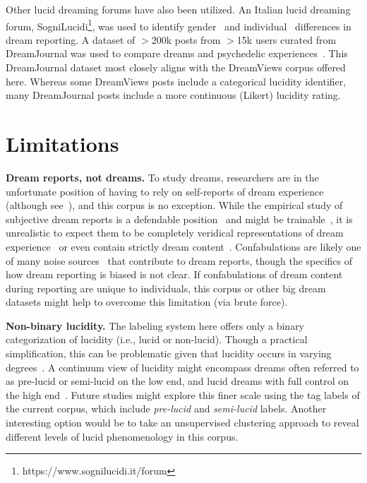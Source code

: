 \documentclass[10pt,a4paper,twocolumn]{article}
\begin{document}
\par
Other lucid dreaming forums have also been utilized. An Italian lucid dreaming forum, SogniLucidi\footnote{https://www.sognilucidi.it/forum}, was used to identify gender~\cite{manna2019} and individual~\cite{manna2020} differences in dream reporting. A dataset of $>$200k posts from $>$15k users curated from DreamJournal was used to compare dreams and psychedelic experiences~\cite{sanz2018}. This DreamJournal dataset most closely aligns with the DreamViews corpus offered here. Whereas some DreamViews posts include a categorical lucidity identifier, many DreamJournal posts include a more continuous (Likert) lucidity rating.

\section{Limitations}\label{sec:limitations}

\textbf{Dream reports, not dreams.}
To study dreams, researchers are in the unfortunate position of having to rely on self-reports of dream experience (although see~\cite{konkoly2021,horikawa2013}), and this corpus is no exception. While the empirical study of subjective dream reports is a defendable position~\cite{windt2013,wamsley2013,solomonova2016,solomonova2014,gonzalez2021,ramm2018} and might be trainable~\cite{trnka2020,miyahara2020}, it is unrealistic to expect them to be completely veridical representations of dream experience~\cite{rosen2013,peels2016,boothe2015,bardina2021} or even contain strictly dream content~\cite{bardina2021}. Confabulations are likely one of many noise sources~\cite{putois2020} that contribute to dream reports, though the specifics of how dream reporting is biased is not clear. If confabulations of dream content during reporting are unique to individuals, this corpus or other big dream datasets might help to overcome this limitation (via brute force).

\smallskip
\noindent
\textbf{Non-binary lucidity.}
The labeling system here offers only a binary categorization of lucidity (i.e., lucid or non-lucid). Though a practical simplification, this can be problematic given that lucidity occurs in varying degrees~\cite{mallett2021}. A continuum view of lucidity might encompass dreams often referred to as pre-lucid or semi-lucid on the low end, and lucid dreams with full control on the high end~\cite{mallett2021,windt2007}. Future studies might explore this finer scale using the tag labels of the current corpus, which include \emph{pre-lucid} and \emph{semi-lucid} labels. Another interesting option would be to take an unsupervised clustering approach to reveal different levels of lucid phenomenology in this corpus.
\end{document}
